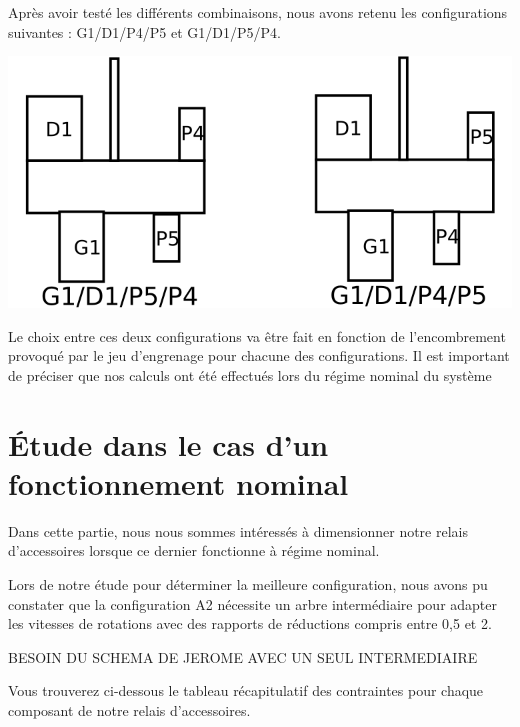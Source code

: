 \documentclass{config}
\begin{document}
\begin{spacing}{1.2}
Après avoir testé les différents combinaisons, nous avons retenu les configurations suivantes : G1/D1/P4/P5 et G1/D1/P5/P4.

\begin{center}
\includegraphics[scale=0.75]{conf_retenu.png}
\end{center}

Le choix entre ces deux configurations va être fait en fonction de l'encombrement provoqué par le jeu d'engrenage pour chacune des configurations. Il est important de préciser que nos calculs ont été effectués lors du régime nominal du système

\newpage
\section{Étude dans le cas d'un fonctionnement nominal}

Dans cette partie, nous nous sommes intéressés à dimensionner notre relais d'accessoires lorsque ce dernier fonctionne à régime nominal. 

Lors de notre étude pour déterminer la meilleure configuration, nous avons pu constater que la configuration A2 nécessite un arbre intermédiaire pour adapter les vitesses de rotations avec des rapports de réductions compris entre  0,5 et 2.

BESOIN DU SCHEMA DE JEROME AVEC UN SEUL INTERMEDIAIRE

Vous trouverez ci-dessous le tableau récapitulatif des contraintes pour chaque composant de notre relais d'accessoires.


\end{spacing}
\end{document}
